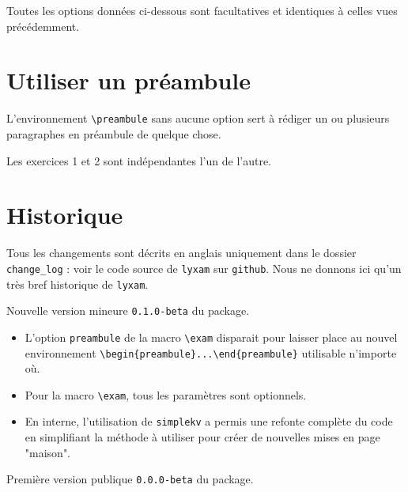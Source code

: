 \documentclass[12pt,a4paper]{scrartcl}
\makeatletter
\theoremstyle{definition}
\newcommand\resetallcnt{
		\setcounter{lyxam@counter@topic}{0}
		\setcounter{lyxam@counter@exercise}{0}
		\setcounter{lyxam@counter@problem}{0}
		\setcounter{lyxam@counter@bonus}{0}
		\setcounter{lyxam@counter@subpart}{0}
	}
\newcommand\IDmacro{\@ifstar{\@IDmacroStar}{\@IDmacroNoStar}}
\newcommand\@IDmacroNoStar[3]{%
        \texttt{%
        	\textbackslash#1%
        	\IfStrEq{#2}{0}{}{%
        		\,\,[#2 Option%
				\IfStrEq{#2}{1}{}{s}]%
			}%
    	    \IfStrEq{#3}{}{}{%
	    		\,\,(#3 Argument%
				\IfStrEq{#3}{1}{}{s})%
			}
	   	}
        \immediate\write\tempfile{macro@#1@#2@#3}%
    }
\newcommand\@IDmacroStar[2]{%
        \@IDmacroNoStar{#1}{0}{#2}%
    }
\makeatother
\begin{document}
Toutes les options données ci-dessous sont facultatives et identiques à celles vues précédemment.

\bigskip


\IDmacro{topic}{6}{}

\exosoptions{}



\section{Utiliser un préambule}

L'environnement \verb+\preambule+ sans aucune option sert à rédiger un ou plusieurs paragraphes en préambule de quelque chose.

\resetallcnt{}

\resetallcnt{}

\begin{tcblisting}{}
\begin{preambule}
	Les exercices 1 et 2 sont indépendantes l'un de l'autre.
\end{preambule}

\exercise
\exercise
\end{tcblisting}





\section{Historique}

Tous les changements sont décrits en anglais uniquement dans le dossier \verb+change_log+ : voir le code source de \verb+lyxam+ sur \verb+github+. Nous ne donnons ici qu'un très bref historique de \verb+lyxam+.

\begin{description}[leftmargin=1em]
	\setlength\itemsep{1em}

	\item[2017-11-12] Nouvelle version mineure \verb+0.1.0-beta+ du package.
	\begin{itemize}
		\item L'option \verb+preambule+ de la macro \verb+\exam+ disparait pour laisser place au nouvel environnement \verb+\begin{preambule}...\end{preambule}+ utilisable n'importe où.

		\item Pour la macro \verb+\exam+, tous les paramètres sont optionnels.
		
		\item En interne, l'utilisation de \verb+simplekv+ a permis une refonte complète du code en simplifiant la méthode à utiliser pour créer de nouvelles mises en page "maison".
	\end{itemize}

	\item[2017-11-03] Première version publique \verb+0.0.0-beta+ du package.
\end{description}
\end{document}
